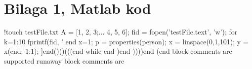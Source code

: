 \section*{Bilaga 1, Matlab kod}
%
%
\begin{matlab}
!touch testFile.txt
A = [1, 2, 3;... %
     4, 5, 6];
fid = fopen('testFile.text', 'w');
for k=1:10
  fprintf(fid, '%
end
x=1; %
p = properties(person); %
x = linspace(0,1,101);
y = x(end:-1:1);
]end()()(((end while {    end    )end ))))end (end}
    block comments are supported
runaway block comments
are
\end{matlab}